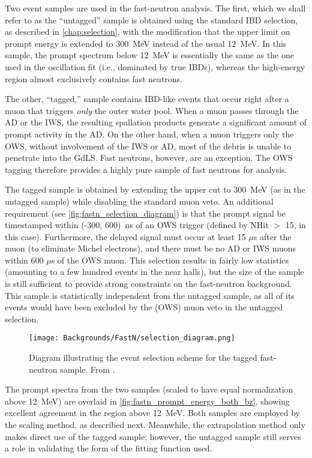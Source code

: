 \documentclass[../thesis.tex]{subfiles}
\begin{document}
Two event samples are used in the fast-neutron analysis. The first, which we shall refer to as the ``untagged'' sample is obtained using the standard IBD selection, as described in \autoref{chap:selection}, with the modification that the upper limit on prompt energy is extended to 300~MeV instead of the usual 12~MeV. In this sample, the prompt spectrum below 12~MeV is essentially the same as the one used in the oscillation fit (i.e., dominated by true IBDs), whereas the high-energy region almost exclusively contains fast neutrons.

The other, ``tagged,'' sample contains IBD-like events that occur right after a muon that triggers \emph{only} the outer water pool. When a muon passes through the AD or the IWS, the resulting spallation products generate a significant amount of prompt activity in the AD. On the other hand, when a muon triggers only the OWS, without involvement of the IWS or AD, most of the debris is unable to penetrate into the GdLS. Fast neutrons, however, are an exception. The OWS tagging therefore provides a highly pure sample of fast neutrons for analysis.

The tagged sample is obtained by extending the upper cut to 300~MeV (as in the untagged sample) while disabling the standard muon veto. An additional requirement (see \autoref{fig:fastn_selection_diagram}) is that the prompt signal be timestamped within (-300, 600)~ns of an OWS trigger (defined by NHit $>$ 15, in this case). Furthermore, the delayed signal must occur at least 15 $\mu$s after the muon (to eliminate Michel electrons), and there must be no AD or IWS muons within 600 $\mu$s of the OWS muon. This selection results in fairly low statistics (amounting to a few hundred events in the near halls), but the size of the sample is still sufficient to provide strong constraints on the fast-neutron background. This sample is statistically independent from the untagged sample, as all of its events would have been excluded by the (OWS) muon veto in the untagged selection.

\begin{figure}[h]
  \texttt{[image: Backgrounds/FastN/selection\_diagram.png]}
  \caption{Diagram illustrating the event selection scheme for the tagged fast-neutron sample. From \cite{fastn}.}
  \label{fig:fastn_selection_diagram}
\end{figure}

The prompt spectra from the two samples (scaled to have equal normalization above 12~MeV) are overlaid in \autoref{fig:fastn_prompt_energy_both_bz}, showing excellent agreement in the region above 12~MeV. Both samples are employed by the scaling method, as described next. Meanwhile, the extrapolation method only makes direct use of the tagged sample; however, the untagged sample still serves a role in validating the form of the fitting function used.
\end{document}
